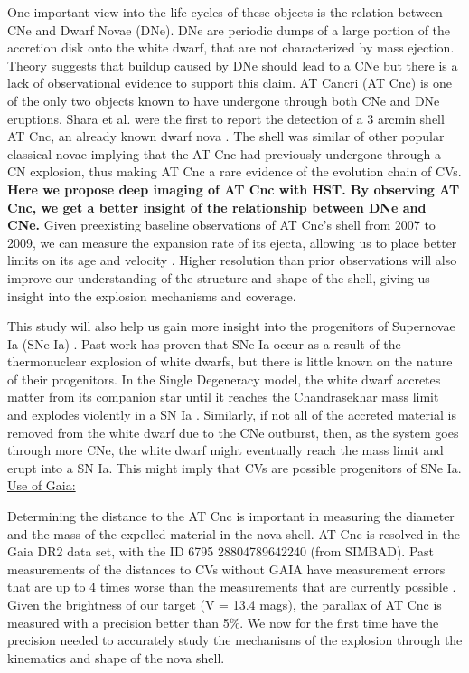 \documentclass[11pt,a4paper]{article}  %
\begin{document}
One important view into the life cycles of these objects is the relation between CNe and Dwarf Novae (DNe). DNe are periodic dumps of a large portion of the accretion disk onto the white dwarf, that are not characterized by mass ejection. Theory suggests that buildup caused by DNe should lead to a CNe but there is a lack of observational evidence to support this claim. AT Cancri (AT Cnc) is one of the only two objects known to have undergone through both CNe and DNe eruptions. Shara et al. were the first to report the detection of a 3 arcmin shell AT Cnc, an already known dwarf nova \cite{shara2012atcnc}. The shell was similar of other popular classical novae implying that the AT Cnc had previously undergone through a CN explosion, thus making AT Cnc a rare evidence of the evolution chain of CVs. \textbf{Here we propose deep imaging of AT Cnc with HST. By observing AT Cnc, we get a better insight of the relationship between DNe and CNe.} Given preexisting baseline observations of AT Cnc's shell from 2007 to 2009, we can measure the expansion rate of its ejecta, allowing us to place better limits on its age and velocity \cite{shara2012atcnc}. Higher resolution than prior observations will also improve our understanding of the structure and shape of the shell, giving us insight into the explosion mechanisms and coverage. 

This study will also help us gain more insight into the progenitors of Supernovae Ia (SNe Ia) \cite{wang2012progenitors}. Past work has proven that SNe Ia occur as a result of the thermonuclear explosion of white dwarfs, but there is little known on the nature of their progenitors. In the Single Degeneracy model, the white dwarf accretes matter from its companion star until it reaches the Chandrasekhar mass limit and explodes violently in a SN Ia  \cite{whelan1973binaries}. Similarly, if not all of the accreted material is removed from the white dwarf due to the CNe outburst, then, as the system goes through more CNe, the white dwarf might eventually reach the mass limit and erupt into a SN Ia. This might imply that CVs are possible progenitors of SNe Ia. 
\vspace{1mm} \\
\noindent \underline{Use of Gaia:} 
\par Determining the distance to the AT Cnc is important in measuring the diameter and the mass of the expelled material in the nova shell. AT Cnc is resolved in the Gaia DR2 data set, with the ID 6795 28804789642240 (from SIMBAD). Past measurements of the distances to CVs without GAIA have measurement errors that are up to 4 times worse than the measurements that are currently possible \cite{gaia_dist}. Given the brightness of our target (V = 13.4 mags), the parallax of AT Cnc is measured with a precision better than 5\%. We now for the first time have the precision needed to accurately study the mechanisms of the explosion through the kinematics and shape of the nova shell.  %
\end{document}
